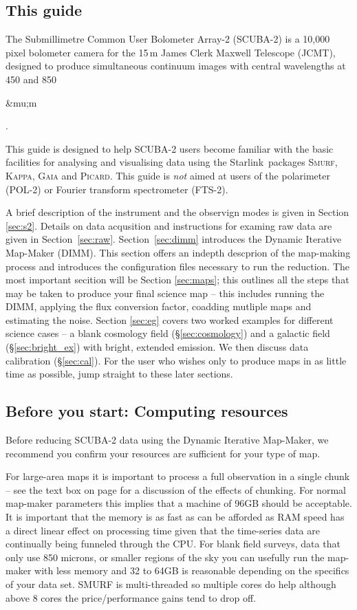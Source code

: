 \documentclass[twoside,11pt]{article}
\newcommand{\micron}{\mbox{\,${\umu}$m}}            %
\newcounter{box}
\newcommand{\htmladdnormallink}[2]{#1}
\newcommand{\xref}[3]{#1}
\newcommand{\xlabel}[1]{}
\renewcommand{\_}{\texttt{\symbol{95}}}
\newcommand{\starlink}{\htmladdnormallink{Starlink}{http://starlink.jach.hawaii.edu}}
\newcommand{\gaia}{\xref{\textsc{Gaia}}{sun214}{}}
\newcommand{\Kappa}{\xref{\textsc{Kappa}}{sun95}{}}
\newcommand{\picard}{\xref{\textsc{Picard}}{sun265}{}}
\newcommand{\smurf}{\xref{\textsc{Smurf}}{sun258}{}}
\renewcommand{\micron}{\begin{rawhtml}&mu;m\end{rawhtml}}
\begin{document}
\subsection{\xlabel{using_guide}This guide}
The Submillimetre Common User Bolometer Array-2 (SCUBA-2) is a 10,000 pixel bolometer camera for the 15\,m James Clerk Maxwell Telescope (JCMT), designed to produce simultaneous continuum images with
central wavelengths at 450 and 850\micron.

This guide is designed to help SCUBA-2 users become familiar with the basic facilities for analysing and visualising data using the \starlink\ packages \smurf \cite{smurf}, \Kappa \cite{kappa}, \gaia \cite{gaia} and \picard \cite{picard}.  This guide is {\em not} aimed at users of the polarimeter (POL-2) or Fourier transform spectrometer (FTS-2).

A brief description of the instrument and the observign modes is given in Section \ref{sec:s2}. Details on data acqusition and instructions for examing raw data are given in Section~\ref{sec:raw}. Section~\ref{sec:dimm} introduces the Dynamic Iterative Map-Maker (DIMM). This section offers an indepth descprion of the map-making process and introduces the configuration files necessary to run the reduction. The most important secition will be Section \ref{sec:maps}; this outlines all the steps that may be taken to produce your final science map -- this includes running the DIMM, applying the flux conversion factor, coadding mutliple maps and estimating the noise.  Section \ref{sec:eg} covers two worked examples for different science cases -- a blank cosmology field (\S\ref{sec:cosmology}) and a galactic field (\S\ref{sec:bright_ex}) with bright, extended emission. We then discuss data calibration (\S\ref{sec:cal}). For the user who wishes only to produce maps in as little time as possible, jump straight to these later sections.

\subsection{\xlabel{computing}Before you start: Computing resources}
Before reducing SCUBA-2 data using the Dynamic Iterative Map-Maker, we recommend you confirm your resources are sufficient for your type of map. 

For large-area maps it is important to process a full observation in a single chunk -- see the text box on page \pageref{page:text} for a discussion of the effects of chunking. For normal map-maker parameters this implies that a machine of 96GB should be acceptable. It is important that the memory is as fast as can be afforded as RAM speed has a direct linear effect on processing time given that the time-series data are continually being funneled through the CPU.  For blank field surveys, data that only use 850 microns, or smaller regions of the sky you can usefully run the map-maker with less memory and 32 to 64GB is reasonable depending on the specifics of your data set. SMURF is multi-threaded so multiple cores do help although above 8 cores the price/performance gains tend to drop off.
\end{document}
